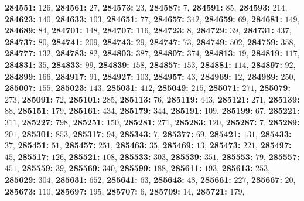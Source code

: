 \textsf{\bfseries 284551:} $126$, \textsf{\bfseries 284561:} $27$, \textsf{\bfseries 284573:} $23$, \textsf{\bfseries 284587:} $7$, \textsf{\bfseries 284591:} $85$, \textsf{\bfseries 284593:} $214$, \textsf{\bfseries 284623:} $140$, \textsf{\bfseries 284633:} $103$, \textsf{\bfseries 284651:} $77$, \textsf{\bfseries 284657:} $342$, \textsf{\bfseries 284659:} $69$, \textsf{\bfseries 284681:} $149$, \textsf{\bfseries 284689:} $84$, \textsf{\bfseries 284701:} $148$, \textsf{\bfseries 284707:} $116$, \textsf{\bfseries 284723:} $8$, \textsf{\bfseries 284729:} $39$, \textsf{\bfseries 284731:} $437$, \textsf{\bfseries 284737:} $80$, \textsf{\bfseries 284741:} $209$, \textsf{\bfseries 284743:} $29$, \textsf{\bfseries 284747:} $73$, \textsf{\bfseries 284749:} $502$, \textsf{\bfseries 284759:} $358$, \textsf{\bfseries 284777:} $132$, \textsf{\bfseries 284783:} $82$, \textsf{\bfseries 284803:} $387$, \textsf{\bfseries 284807:} $374$, \textsf{\bfseries 284813:} $19$, \textsf{\bfseries 284819:} $117$, \textsf{\bfseries 284831:} $35$, \textsf{\bfseries 284833:} $99$, \textsf{\bfseries 284839:} $158$, \textsf{\bfseries 284857:} $153$, \textsf{\bfseries 284881:} $114$, \textsf{\bfseries 284897:} $92$, \textsf{\bfseries 284899:} $166$, \textsf{\bfseries 284917:} $91$, \textsf{\bfseries 284927:} $103$, \textsf{\bfseries 284957:} $43$, \textsf{\bfseries 284969:} $12$, \textsf{\bfseries 284989:} $250$, \textsf{\bfseries 285007:} $155$, \textsf{\bfseries 285023:} $143$, \textsf{\bfseries 285031:} $412$, \textsf{\bfseries 285049:} $215$, \textsf{\bfseries 285071:} $271$, \textsf{\bfseries 285079:} $273$, \textsf{\bfseries 285091:} $72$, \textsf{\bfseries 285101:} $285$, \textsf{\bfseries 285113:} $76$, \textsf{\bfseries 285119:} $443$, \textsf{\bfseries 285121:} $271$, \textsf{\bfseries 285139:} $88$, \textsf{\bfseries 285151:} $179$, \textsf{\bfseries 285161:} $434$, \textsf{\bfseries 285179:} $344$, \textsf{\bfseries 285191:} $109$, \textsf{\bfseries 285199:} $67$, \textsf{\bfseries 285221:} $311$, \textsf{\bfseries 285227:} $798$, \textsf{\bfseries 285251:} $150$, \textsf{\bfseries 285281:} $271$, \textsf{\bfseries 285283:} $120$, \textsf{\bfseries 285287:} $7$, \textsf{\bfseries 285289:} $201$, \textsf{\bfseries 285301:} $853$, \textsf{\bfseries 285317:} $94$, \textsf{\bfseries 285343:} $7$, \textsf{\bfseries 285377:} $69$, \textsf{\bfseries 285421:} $131$, \textsf{\bfseries 285433:} $37$, \textsf{\bfseries 285451:} $51$, \textsf{\bfseries 285457:} $251$, \textsf{\bfseries 285463:} $35$, \textsf{\bfseries 285469:} $13$, \textsf{\bfseries 285473:} $221$, \textsf{\bfseries 285497:} $45$, \textsf{\bfseries 285517:} $126$, \textsf{\bfseries 285521:} $108$, \textsf{\bfseries 285533:} $303$, \textsf{\bfseries 285539:} $351$, \textsf{\bfseries 285553:} $79$, \textsf{\bfseries 285557:} $451$, \textsf{\bfseries 285559:} $39$, \textsf{\bfseries 285569:} $340$, \textsf{\bfseries 285599:} $188$, \textsf{\bfseries 285611:} $193$, \textsf{\bfseries 285613:} $253$, \textsf{\bfseries 285629:} $304$, \textsf{\bfseries 285631:} $652$, \textsf{\bfseries 285641:} $63$, \textsf{\bfseries 285643:} $48$, \textsf{\bfseries 285661:} $227$, \textsf{\bfseries 285667:} $20$, \textsf{\bfseries 285673:} $110$, \textsf{\bfseries 285697:} $195$, \textsf{\bfseries 285707:} $6$, \textsf{\bfseries 285709:} $14$, \textsf{\bfseries 285721:} $179$, 
